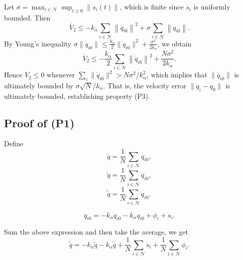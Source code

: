 Let $\sigma = \max_{i\in\mathcal{N}} \sup_{t\geq 0} \|\dot{s}_i(t)\|$, which is finite since $\dot{s}_i$ is uniformly bounded.
Then
\begin{equation*}\label{eq:V2_bound}
	\dot{V_2} \leq -k_\alpha\sum_{i\in\mathcal{N}}\left\| \dot{q}_{i0} \right\|^2 + \sigma\sum_{i\in\mathcal{N}}\left\| \dot{q}_{i0} \right\|.
\end{equation*}
By Young's inequality $\sigma\|\dot{q}_{i0}\| \leq \frac{k_\alpha}{2}\|\dot{q}_{i0}\|^2 + \frac{\sigma^2}{2k_\alpha}$, we obtain
\begin{equation*}\label{eq:V2_practical}
	\dot{V_2} \leq -\frac{k_\alpha}{2}\sum_{i\in\mathcal{N}}\left\| \dot{q}_{i0} \right\|^2 + \frac{N\sigma^2}{2k_\alpha}.
\end{equation*}
Hence $\dot{V_2} \leq 0$ whenever $\sum_i\|\dot{q}_{i0}\|^2 > N\sigma^2/k_\alpha^2$, which implies that $\|\dot{q}_{i0}\|$ is ultimately bounded by $\sigma\sqrt{N}/k_\alpha$. That is, the velocity error $\|\dot{q}_i - \dot{q}_0\|$ is ultimately bounded, establishing property (P3).



\subsection*{Proof of (P1)}

Define
\begin{equation*}\label{eq:q_tilde}
	\tilde{q}=\frac{1}{N}\sum_{i\in\mathcal{N}}q_{i0},
\end{equation*}
\begin{equation*}\label{eq:q_tilde_dot}
	\dot{\tilde{q}}=\frac{1}{N}\sum_{i\in\mathcal{N}}\dot{q}_{i0},
\end{equation*}
\begin{equation*}\label{eq:q_tilde_ddot}
	\ddot{\tilde{q}}=\frac{1}{N}\sum_{i\in\mathcal{N}}\ddot{q}_{i0},
\end{equation*}

\begin{equation*}\label{eq:q_i0_ddot}
	\ddot{q}_{i0}=-k_\alpha \dot{q}_{i0} -k_\alpha {q}_{i0} + \phi_i + \dot{s}_i.
\end{equation*}

Sum the above expression and then take the average, we get
\begin{equation*}\label{eq:q_tilde_ddot_final}
	\ddot{\tilde{q}}=-k_\alpha \dot{\tilde{q}} -k_\alpha\tilde{q}+\frac{1}{N}\sum_{i\in\mathcal{N}}\dot{s}_i+\frac{1}{N}\sum_{i\in\mathcal{N}}\phi_{i}.
\end{equation*}

